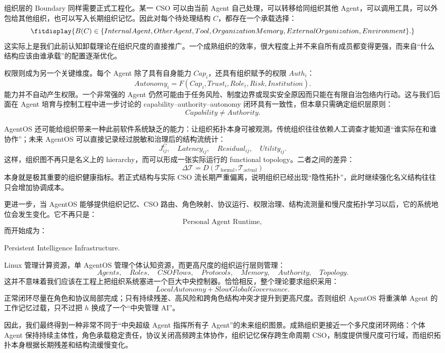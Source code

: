 组织层的 Boundary 同样需要正式工程化。某一 CSO 可以由当前 Agent 自己处理，可以转移给同组织其他 Agent，可以调用工具，可以外包给其他组织，也可以写入长期组织记忆。因此对每个待处理结构 $C$，都存在一个承载选择：
\[
\fitdisplay{
B(C)
\in
\{
InternalAgent,
OtherAgent,
Tool,
OrganizationMemory,
ExternalOrganization,
Environment
\}.
}
\]
这实际上是我们此前认知卸载理论在组织尺度的直接推广。一个成熟组织的效率，很大程度上并不来自所有成员都变得更强，而来自“什么结构应该由谁承载”的配置逐渐优化。

权限则成为另一个关键维度。每个 Agent 除了具有自身能力 $Cap_i$，还具有组织赋予的权限 $Auth_i$：
\[
Autonomy_i
=
F(
Cap_i,
Trust_i,
Role_i,
Risk,
Institution
).
\]
能力并不自动产生权限。一个非常强的 Agent 仍然可能由于任务风险、制度边界或现实安全原因而只能在有限自治包络内行动。这与我们后面在 Agent 培育与控制工程中进一步讨论的 capability--authority--autonomy 闭环具有一致性，但本章只需确定组织层原则：
\[
\boxed{
Capability\neq Authority.
}
\]

AgentOS 还可能给组织带来一种此前软件系统缺乏的能力：让组织拓扑本身可被观测。传统组织往往依赖人工调查才能知道“谁实际在和谁协作”；未来 AgentOS 可以直接记录经过脱敏和治理后的结构流统计：
\[
J^{C}_{ij},
\quad
Latency_{ij},
\quad
Residual_{ij},
\quad
Utility_{ij}.
\]
这样，组织图不再只是名义上的 hierarchy，而可以形成一张实际运行的 functional topology。二者之间的差异：
\[
\Delta\mathcal T
=
D(
\mathcal T_{\mathrm{formal}},
\mathcal T_{\mathrm{actual}}
)
\]
本身就是极其重要的组织健康指标。若正式结构与实际 CSO 流长期严重偏离，说明组织已经出现“隐性拓扑”，此时继续强化名义结构往往只会增加协调成本。

更进一步，当 AgentOS 能够提供组织记忆、CSO 路由、角色映射、协议运行、权限治理、结构流测量和慢尺度拓扑学习以后，它的系统地位会发生变化。它不再只是：
\[
\text{Personal Agent Runtime},
\]
而开始成为：
\begin{statementbox}
Persistent Intelligence Infrastructure.
\end{statementbox}
Linux 管理计算资源，单 AgentOS 管理个体认知资源，而更高尺度的组织运行层则管理：
\[
Agents,\quad
Roles,\quad
CSOFlows,\quad
Protocols,\quad
Memory,\quad
Authority,\quad
Topology.
\]
这并不意味着我们应该在工程上把组织系统塞进一个巨大中央控制器。恰恰相反，整个理论要求组织采用：
\[
\boxed{
LocalAutonomy
+
SlowGlobalGovernance.
}
\]
正常闭环尽量在角色和协议局部完成；只有持续残差、高风险和跨角色结构冲突才提升到更高尺度。否则组织 AgentOS 将重演单 Agent 的工作记忆过载，只不过把 $h$ 换成了一个“中央管理 AI”。

因此，我们最终得到一种非常不同于“中央超级 Agent 指挥所有子 Agent”的未来组织图景。成熟组织更接近一个多尺度闭环网络：个体 Agent 保持持续主体性，角色承载稳定责任，协议关闭高频跨主体协作，组织记忆保存跨生命周期 CSO，制度提供慢尺度可行域，而组织拓扑本身根据长期残差和结构流缓慢变化。

